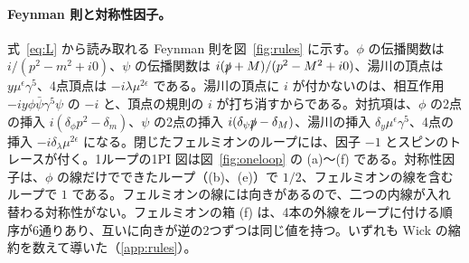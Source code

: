 \documentclass[a4paper,10pt]{ltjsarticle}
\begin{document}
\paragraph{Feynman 則と対称性因子。}式~\eqref{eq:L} から読み取れる Feynman 則を図~\ref{fig:rules} に示す。$\phi$ の伝播関数は $i/(p^2-m^2+i0)$、$\psi$ の伝播関数は $i(\slashed p+M)/(p^2-M^2+i0)$、湯川の頂点は $y\mu^\epsilon\gamma^5$、4点頂点は $-i\lambda\mu^{2\epsilon}$ である。湯川の頂点に $i$ が付かないのは、相互作用 $-iy\phi\bar\psi\gamma^5\psi$ の $-i$ と、頂点の規則の $i$ が打ち消すからである。対抗項は、$\phi$ の2点の挿入 $i(\delta_\phi p^2-\delta_m)$、$\psi$ の2点の挿入 $i(\delta_\psi\slashed p-\delta_M)$、湯川の挿入 $\delta_y\mu^\epsilon\gamma^5$、4点の挿入 $-i\delta_\lambda\mu^{2\epsilon}$ になる。閉じたフェルミオンのループには、因子 $-1$ とスピンのトレースが付く。1ループの1PI 図は図~\ref{fig:oneloop} の (a)〜(f) である。対称性因子は、$\phi$ の線だけでできたループ（(b)、(e)）で $1/2$、フェルミオンの線を含むループで $1$ である。フェルミオンの線には向きがあるので、二つの内線が入れ替わる対称性がない。フェルミオンの箱 (f) は、4本の外線をループに付ける順序が6通りあり、互いに向きが逆の2つずつは同じ値を持つ。いずれも Wick の縮約を数えて導いた（\ref{app:rules}）。
\end{document}
